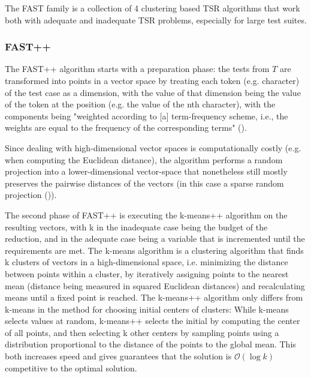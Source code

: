 The FAST family is a collection of 4 clustering based TSR algorithms
that work both with adequate and inadequate TSR problems, especially
for large test suites.

\subsubsection{FAST++}


The FAST++ algorithm starts with a preparation phase: the tests from $T$
are transformed into points in a vector space by treating each token
(e.g. character) of the test case as a dimension, with the value of that
dimension being the value of the token at the position (e.g. the value
of the nth character), with the components being "weighted according to
[a] term-frequency scheme, i.e., the weights are equal to the frequency
of the corresponding terms" (\cite{cruciani2019scalable}).

Since dealing with high-dimensional vector spaces is computationally
costly (e.g. when computing the Euclidean distance), the algorithm
performs a random projection into a lower-dimensional vector-space that
nonetheless still mostly preserves the pairwise distances of the vectors
(in this case a sparse random projection (\cite{achlioptas2003database})).

The second phase of FAST++ is executing the k-means++ algorithm \cite{arthur2006k}
on the resulting vectors, with k in the inadequate case being the
budget of the reduction, and in the adequate case being a variable
that is incremented until the requirements are met. The k-means
algorithm is a clustering algorithm that finds k clusters of vectors in a
high-dimensional space, i.e. minimizing the distance between points within
a cluster, by iteratively assigning points to the nearest mean (distance
being measured in squared Euclidean distances) and recalculating means
until a fixed point is reached. The k-means++ algorithm only differs
from k-means in the method for choosing initial centers of clusters:
While k-means selects values at random, k-means++ selects the initial by
computing the center of all points, and then selecting k other centers by
sampling points using a distribution proportional to the distance of the
points to the global mean. This both increases speed %
and gives guarantees that the solution is $\mathcal{O}(\log k)$ competitive
to the optimal solution. %

